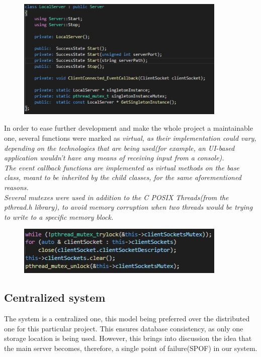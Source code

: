 \documentclass[runningheads]{llncs}
\begin{document}
\begin{figure}[H]
\centering
\includegraphics[width=100mm]{LocalServer.png}
\end{figure}

In order to ease further development and make the whole project a maintainable one, several functions were marked as \it {virtual}, as their implementation could vary, depending on the technologies that are being used(for example, an UI-based application wouldn't have any means of receiving input from a console).\\
The event callback functions are implemented as virtual methods on the base class, meant to be inherited by the child classes, for the same aforementioned reasons.\\

Several mutexes were used in addition to the C POSIX Threads(from the \it {pthread.h} library), to avoid memory corruption when two threads would be trying to write to a specific memory block.\\
\begin{figure}[H]
\centering
\includegraphics[width=100mm]{Mutex.png}
\end{figure}

\subsection{Centralized system}
The system is a centralized one, this model being preferred over the distributed one for this particular project. This ensures database consistency, as only one storage location is being used. However, this brings into discussion the idea that the main server becomes, therefore, a single point of failure(SPOF) in our system.
\end{document}
